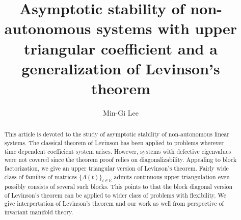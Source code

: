 \documentclass[a4paper,11pt]{article}
\theoremstyle{remark}
\begin{document}
\title{Asymptotic stability of non-autonomous systems with upper triangular coefficient and a generalization of Levinson's theorem}
\author{Min-Gi Lee\footnotemark[1]}
\date{}

\maketitle
\renewcommand{\thefootnote}{\fnsymbol{footnote}}
\renewcommand{\thefootnote}{\arabic{footnote}}

\begin{abstract}
This article is devoted to the study of asymptotic stability of non-autonomous linear systems. The classical theorem of Levinson has been applied to problems wherever time dependent coefficient system arises. However, systems with defective eigenvalues were not covered since the theorem proof relies on diagonalizability. Appealing to block factorization, we give an upper triangular version of Levinson's theorem. Fairly wide class of families of matrices $\{A(t)\}_{t\in \mathbb{R}}$ admits continuous upper triangulation even possibly consists of several such blocks. This points to that the block diagonal version of Levinson's theorem can be applied to wider class of problems with flexibility. We give interpertation of Levinson's theorem and our work as well from perspective of invariant manifold theory.%


%
%
\end{abstract}
\end{document}
